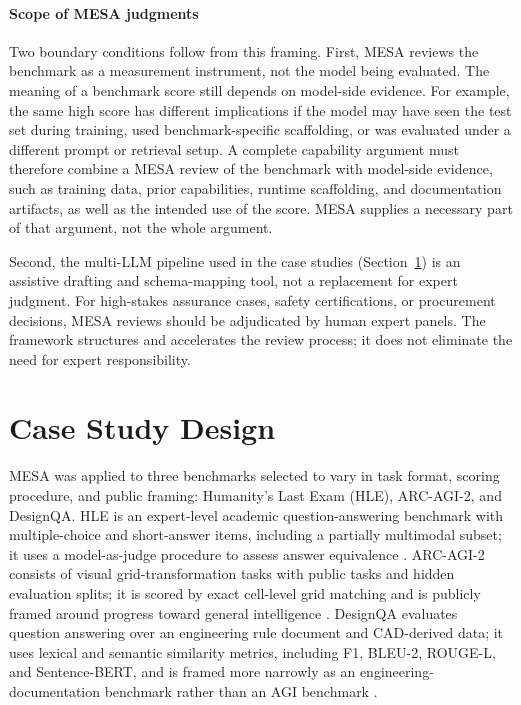 \documentclass[conference]{IEEEtran}
\begin{document}
    \paragraph{Scope of MESA judgments}
    Two boundary conditions follow from this framing. First, MESA reviews the benchmark as a measurement instrument, not the model being evaluated. The meaning of a benchmark score still depends on model-side evidence. For example, the same high score has different implications if the model may have seen the test set during training, used benchmark-specific scaffolding, or was evaluated under a different prompt or retrieval setup. A complete capability argument must therefore combine a MESA review of the benchmark with model-side evidence, such as training data, prior capabilities, runtime scaffolding, and documentation artifacts, as well as the intended use of the score. MESA supplies a necessary part of that argument, not the whole argument.
    
    Second, the multi-LLM pipeline used in the case studies (Section~\ref{sec:demonstration}) is an assistive drafting and schema-mapping tool, not a replacement for expert judgment. For high-stakes assurance cases, safety certifications, or procurement decisions, MESA reviews should be adjudicated by human expert panels. The framework structures and accelerates the review process; it does not eliminate the need for expert responsibility.

\section{Case Study Design}
\label{sec:demonstration}

    MESA was applied to three benchmarks selected to vary in task format, scoring procedure, and public framing: Humanity's Last Exam (HLE), ARC-AGI-2, and DesignQA. HLE is an expert-level academic question-answering benchmark with multiple-choice and short-answer items, including a partially multimodal subset; it uses a model-as-judge procedure to assess answer equivalence \cite{phan_etal_hle_2025}. ARC-AGI-2 consists of visual grid-transformation tasks with public tasks and hidden evaluation splits; it is scored by exact cell-level grid matching and is publicly framed around progress toward general intelligence \cite{chollet_arc_agi_2_2025}. DesignQA evaluates question answering over an engineering rule document and CAD-derived data; it uses lexical and semantic similarity metrics, including F1, BLEU-2, ROUGE-L, and Sentence-BERT, and is framed more narrowly as an engineering-documentation benchmark rather than an AGI benchmark \cite{doris_designqa_2024}.
    
\end{document}
